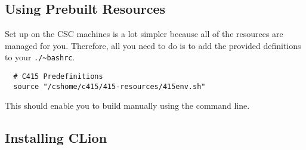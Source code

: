 \documentclass[../setup.tex]{subfiles}
\begin{document}
\subsection{Using Prebuilt Resources}
Set up on the CSC machines is a lot simpler because all of the resources are managed for you.
Therefore, all you need to do is to add the provided definitions to your \lstinline{./~bashrc}.
\begin{lstlisting}
  # C415 Predefinitions
  source "/cshome/c415/415-resources/415env.sh"
\end{lstlisting}
This should enable you to build manually using the command line.

\subsection{Installing CLion}
\end{document}
